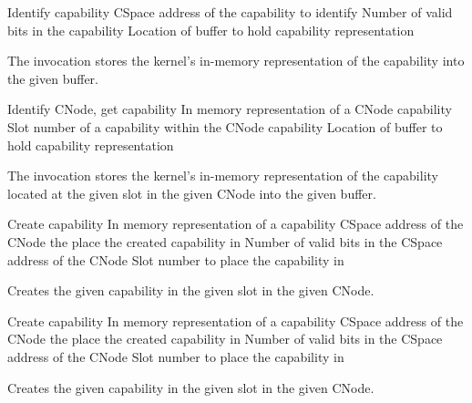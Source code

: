 \begin{invocation}{Identify capability}
  \arg CSpace address of the capability to identify
  \arg Number of valid bits in the capability
  \arg Location of buffer to hold capability representation
\end{invocation}
The invocation stores the kernel's in-memory representation of the
capability into the given buffer.

\begin{invocation}{Identify CNode, get capability}
  \arg In memory representation of a CNode capability
  \arg Slot number of a capability within the CNode capability
  \arg Location of buffer to hold capability representation
\end{invocation}
The invocation stores the kernel's in-memory representation of the
capability located at the given slot in the given CNode into the given
buffer.

\begin{invocation}{Create capability}
  \arg In memory representation of a capability
  \arg CSpace address of the CNode the place the created capability in
  \arg Number of valid bits in the CSpace address of the CNode
  \arg Slot number to place the capability in
\end{invocation}
Creates the given capability in the given slot in the given CNode.

\begin{invocation}{Create capability}
  \arg In memory representation of a capability
  \arg CSpace address of the CNode the place the created capability in
  \arg Number of valid bits in the CSpace address of the CNode
  \arg Slot number to place the capability in
\end{invocation}
Creates the given capability in the given slot in the given CNode.

